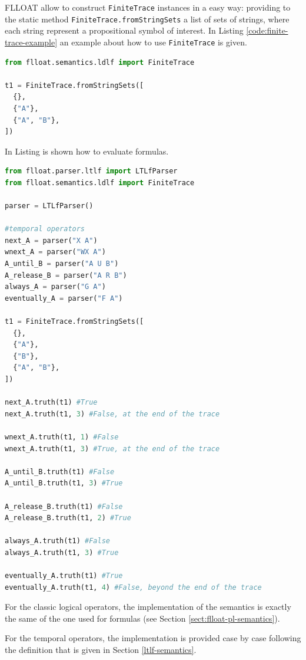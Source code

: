 FLLOAT allow to construct \texttt{FiniteTrace} instances in a easy way: providing to the static method \texttt{FiniteTrace.fromStringSets} a list of sets of strings, where each string represent a propositional symbol of interest. In Listing \ref{code:finite-trace-example} an example about how to use \texttt{FiniteTrace} is given.
\begin{lstlisting}[language=Python, style=Python,  escapechar = £, label={code:finite-trace-example}, caption={Defining a finite trace $\trace = \tup{\set{}, \set{A}, \set{A, B}}$ in FLLOAT.}]
from flloat.semantics.ldlf import FiniteTrace

t1 = FiniteTrace.fromStringSets([
  {},
  {"A"},
  {"A", "B"},
])
\end{lstlisting}

In Listing is shown how to evaluate \LTLf formulas.
\begin{lstlisting}[language=Python, style=Python,  escapechar = £, label={code:ltlf-semantics-examples}, caption={Some examples about how evaluate \LTLf formulas.}]
from flloat.parser.ltlf import LTLfParser
from flloat.semantics.ldlf import FiniteTrace

parser = LTLfParser() 

#temporal operators
next_A = parser("X A")
wnext_A = parser("WX A")
A_until_B = parser("A U B")
A_release_B = parser("A R B")
always_A = parser("G A")
eventually_A = parser("F A")

t1 = FiniteTrace.fromStringSets([
  {},
  {"A"},
  {"B"},
  {"A", "B"},
])

next_A.truth(t1) #True
next_A.truth(t1, 3) #False, at the end of the trace

wnext_A.truth(t1, 1) #False
wnext_A.truth(t1, 3) #True, at the end of the trace

A_until_B.truth(t1) #False
A_until_B.truth(t1, 3) #True

A_release_B.truth(t1) #False
A_release_B.truth(t1, 2) #True

always_A.truth(t1) #False
always_A.truth(t1, 3) #True

eventually_A.truth(t1) #True
eventually_A.truth(t1, 4) #False, beyond the end of the trace
\end{lstlisting}

For the \LTLf classic logical operators, the implementation of the semantics is exactly the same of the one used for \PL formulas (see Section \ref{sect:flloat-pl-semantics}).

For the \LTLf temporal operators, the implementation is provided case by case following the definition that is given in Section \ref{ltlf-semantics}.

